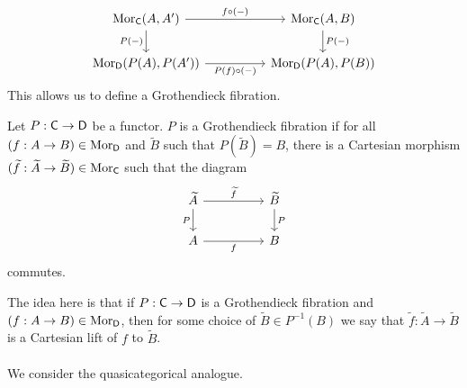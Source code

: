 \begin{equation}\label{fig: cartesian as pullback}
\begin{tikzcd}
	{\Mor_{\Csf}(A,A')} && {\Mor_{\Csf}(A,B)} \\
	{\Mor_{\Dsf}(P(A),P(A'))} && {\Mor_{\Dsf}(P(A),P(B))}
	\arrow["{f\circ(-)}", from=1-1, to=1-3]
	\arrow["{P(f)\circ(-)}"', from=2-1, to=2-3]
	\arrow["{P(-)}", from=1-3, to=2-3]
	\arrow["{P(-)}"', from=1-1, to=2-1]
\end{tikzcd}
\end{equation}
This allows us to define a Grothendieck fibration. 
\begin{definition}\label{def: Grothendieck Fibration}
	Let $P:\mathsf{C}\to\mathsf{D}$ be a functor. $P$ is a Grothendieck fibration if for all $(f:A\to B)\in\mathrm{Mor}_{\mathsf{D}}$ and $\widetilde{B}$ such that $P(\widetilde{B})=B$, there is a Cartesian morphism $(\widetilde{f}:\widetilde{A}\to\widetilde{B})\in\mathrm{Mor}_{\mathsf{C}}$ such that the diagram 
	$$%
	\begin{tikzcd}
		{\widetilde{A}} && {\widetilde{B}} \\
		A && B
		\arrow["{\widetilde{f}}", from=1-1, to=1-3]
		\arrow["f"', from=2-1, to=2-3]
		\arrow["P", from=1-3, to=2-3]
		\arrow["P"', from=1-1, to=2-1]
	\end{tikzcd}$$
	commutes. 
\end{definition}
The idea here is that if $P:\mathsf{C}\to\mathsf{D}$ is a Grothendieck fibration and $(f:A\to B)\in\mathrm{Mor}_{\mathsf{D}}$, then for some choice of $\widetilde{B}\in P^{-1}(B)$ we say that $\widetilde{f}:\widetilde{A}\to\widetilde{B}$ is a Cartesian lift of $f$ to $\widetilde{B}$. 
\\\\
We consider the quasicategorical analogue. 
